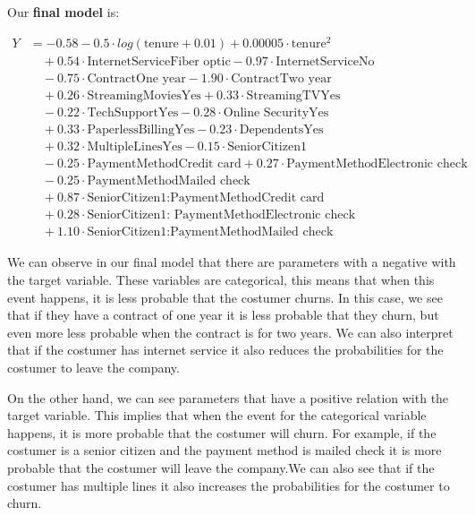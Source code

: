 \documentclass[
  twoside]{article}
\begin{document}
Our \textbf{final model} is:

\[
\begin{aligned}
Y &= -0.58 - 0.5 \cdot log(\text{tenure}+0.01) + 0.00005 \cdot \text{tenure}^2 \\
&\quad + 0.54 \cdot \text{InternetServiceFiber optic} - 0.97 \cdot \text{InternetServiceNo} \\
&\quad - 0.75 \cdot \text{ContractOne year} - 1.90 \cdot \text{ContractTwo year} \\
&\quad + 0.26 \cdot \text{StreamingMoviesYes} + 0.33 \cdot \text{StreamingTVYes} \\
&\quad - 0.22 \cdot \text{TechSupportYes} - 0.28 \cdot \text{Online SecurityYes} \\
&\quad + 0.33 \cdot \text{PaperlessBillingYes} - 0.23 \cdot \text{DependentsYes} \\
&\quad + 0.32 \cdot \text{MultipleLinesYes} - 0.15 \cdot \text{SeniorCitizen1} \\
&\quad - 0.25 \cdot \text{PaymentMethodCredit card} + 0.27 \cdot \text{PaymentMethodElectronic check} \\
&\quad - 0.25 \cdot \text{PaymentMethodMailed check} \\
&\quad + 0.87 \cdot \text{SeniorCitizen1:PaymentMethodCredit card} \\
&\quad + 0.28 \cdot \text{SeniorCitizen1: PaymentMethodElectronic check} \\
&\quad + 1.10 \cdot \text{SeniorCitizen1:PaymentMethodMailed check}
\end{aligned}
\]

We can observe in our final model that there are parameters with a
negative with the target variable. These variables are categorical, this
means that when this event happens, it is less probable that the
costumer churns. In this case, we see that if they have a contract of
one year it is less probable that they churn, but even more less
probable when the contract is for two years. We can also interpret that
if the costumer has internet service it also reduces the probabilities
for the costumer to leave the company.

On the other hand, we can see parameters that have a positive relation
with the target variable. This implies that when the event for the
categorical variable happens, it is more probable that the costumer will
churn. For example, if the costumer is a senior citizen and the payment
method is mailed check it is more probable that the costumer will leave
the company.We can also see that if the costumer has multiple lines it
also increases the probabilities for the costumer to churn.
\end{document}
